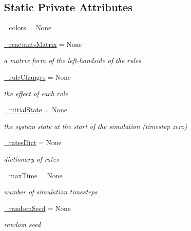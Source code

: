 \subsection*{Static Private Attributes}
\begin{DoxyCompactItemize}
\item 
\hyperlink{class_mu_mo_t_1_1_mu_mo_t_1_1_mu_mo_t_s_s_a_view_a6aaed74c935ed5380691798f75527a18}{\+\_\+colors} = None
\item 
\hyperlink{class_mu_mo_t_1_1_mu_mo_t_1_1_mu_mo_t_s_s_a_view_a2fc08b0021064bc60e2a9349157357bc}{\+\_\+reactants\+Matrix} = None
\begin{DoxyCompactList}\small\item\em a matrix form of the left-\/handside of the rules \end{DoxyCompactList}\item 
\hyperlink{class_mu_mo_t_1_1_mu_mo_t_1_1_mu_mo_t_s_s_a_view_a6a882ef2523ac168ac8a5c87e78b8ed0}{\+\_\+rule\+Changes} = None
\begin{DoxyCompactList}\small\item\em the effect of each rule \end{DoxyCompactList}\item 
\hyperlink{class_mu_mo_t_1_1_mu_mo_t_1_1_mu_mo_t_s_s_a_view_a8afeb8cf5705c6b521f7d6658dab955b}{\+\_\+initial\+State} = None
\begin{DoxyCompactList}\small\item\em the system state at the start of the simulation (timestep zero) \end{DoxyCompactList}\item 
\hyperlink{class_mu_mo_t_1_1_mu_mo_t_1_1_mu_mo_t_s_s_a_view_a7c4303b3e2a8784a0cc16cd523069203}{\+\_\+rates\+Dict} = None
\begin{DoxyCompactList}\small\item\em dictionary of rates \end{DoxyCompactList}\item 
\hyperlink{class_mu_mo_t_1_1_mu_mo_t_1_1_mu_mo_t_s_s_a_view_a956572b83e957005ef90a30995891585}{\+\_\+max\+Time} = None
\begin{DoxyCompactList}\small\item\em number of simulation timesteps \end{DoxyCompactList}\item 
\hyperlink{class_mu_mo_t_1_1_mu_mo_t_1_1_mu_mo_t_s_s_a_view_a79e90c970112c845893400f85a2590dd}{\+\_\+random\+Seed} = None
\begin{DoxyCompactList}\small\item\em random seed \end{DoxyCompactList}\item 

\end{DoxyCompactItemize}

